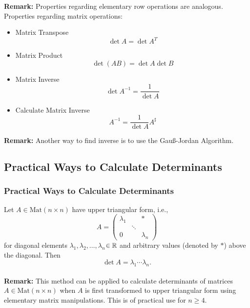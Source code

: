 \documentclass[12pt, t]{beamer}
\newcommand{\myseries}[2]{$#1_1,#1_2,\dots,#1_#2$}
\newcommand{\remark}{\textbf{Remark: }}
\begin{document}
\begin{frame}[allowframebreaks]
    \remark Properties regarding elementary row operations are analogous.
    \newpage
    Properties regarding matrix operations:
    \begin{itemize}
        \item Matrix Transpose$$\det A=\det A^T$$
        \item Matrix Product $$\det (AB)=\det A \det B$$
        \item Matrix Inverse $$\det A^{-1}=\dfrac{1}{\det A}$$
        \item Calculate Matrix Inverse\[A^{-1}=\frac{1}{\det A}A^{\sharp}\]
    \end{itemize}
    \remark Another way to find inverse is to use the Gau\ss-Jordan Algorithm.
\end{frame}

\subsection{Practical Ways to Calculate Determinants}
\begin{frame}
    \frametitle{Practical Ways to Calculate Determinants}
    Let $A\in\text{Mat}(n\times n)$ have upper triangular form, i.e.,
    \[A=\begin{pmatrix}
            \lambda_1 &        & *         \\
                      & \ddots &           \\
            0         &        & \lambda_n
        \end{pmatrix}\]
    for diagonal elements \myseries{\lambda}{n}$\in\mathbb{R}$ and arbitrary values (denoted by $*$) above the diagonal. Then
    \[\det A=\lambda_1\cdots\lambda_n.\]
    \\[9pt]
    \remark
    This method can be applied to calculate determinants of matrices $A\in\text{Mat}(n\times n)$ when $A$ is first transformed to upper triangular form using elementary matrix manipulations. This is of practical use for $n\geq 4$.


\end{frame}
\end{document}
